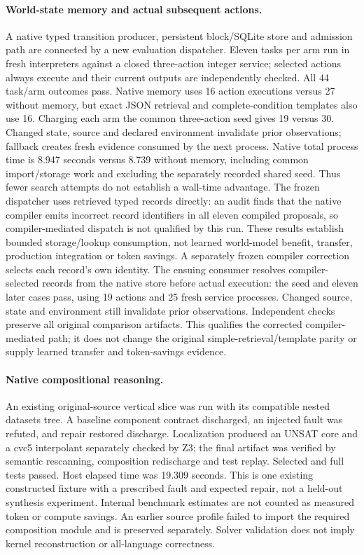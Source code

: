 \paragraph{World-state memory and actual subsequent actions.}
A native typed transition producer, persistent block/SQLite store and admission
path are connected by a new evaluation dispatcher. Eleven tasks per arm run in
fresh interpreters against a closed three-action integer service; selected
actions always execute and their current outputs are independently checked.
All 44 task/arm outcomes pass. Native memory uses 16 action executions versus
27 without memory, but exact JSON retrieval and complete-condition templates
also use 16. Charging each arm the common three-action seed gives 19 versus
30. Changed state, source and declared environment invalidate prior observations;
fallback creates fresh evidence consumed by the next process.
Native total process time is 8.947 seconds versus 8.739 without
memory, including common import/storage work and excluding the separately
recorded shared seed. Thus fewer search attempts do not establish a wall-time
advantage. The frozen dispatcher uses retrieved typed records directly: an
audit finds that the native compiler emits incorrect record identifiers in
all eleven compiled proposals, so compiler-mediated dispatch is not qualified
by this run. These results establish bounded storage/lookup consumption, not
learned world-model benefit, transfer, production integration or token savings.
A separately frozen compiler correction selects each record's own identity.
The ensuing consumer resolves compiler-selected records from the native store
before actual execution: the seed and eleven later cases pass, using 19 actions
and 25 fresh service processes. Changed source, state and environment still
invalidate prior observations. Independent checks preserve all original
comparison artifacts. This qualifies the corrected compiler-mediated path;
it does not change the original simple-retrieval/template parity or supply
learned transfer and token-savings evidence.

\paragraph{Native compositional reasoning.}
An existing original-source vertical slice was run with its compatible nested
datasets tree. A baseline component contract discharged, an injected fault was
refuted, and repair restored discharge. Localization produced an UNSAT core and
a cvc5 interpolant separately checked by Z3; the final artifact was verified by
semantic rescanning, composition redischarge and test replay. Selected and full
tests passed. Host elapsed time was 19.309 seconds. This is one existing
constructed fixture with a prescribed fault and expected repair, not a held-out
synthesis experiment. Internal benchmark estimates are not counted as measured
token or compute savings. An earlier source profile failed to import the
required composition module and is preserved separately. Solver validation
does not imply kernel reconstruction or all-language correctness.

